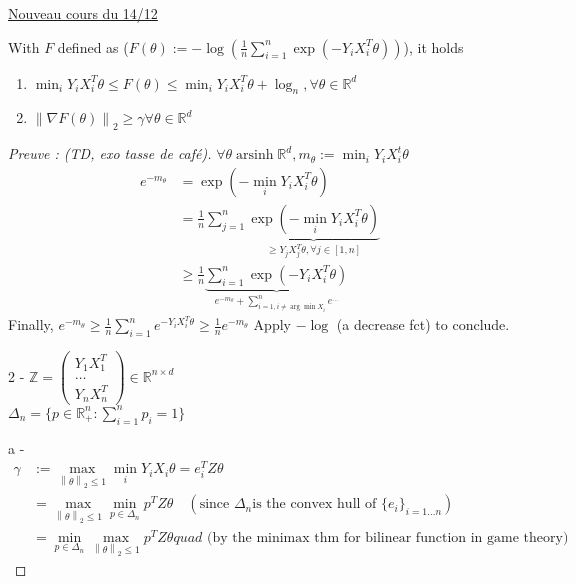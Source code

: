 \underline{Nouveau cours du 14/12} \\

\begin{lem}\label{lemma:ii}
    With $F$ defined as ($F(\theta ) := - \log (\frac{1 }{n } \sum_{i=1 }^{n } \exp (-Y_i X_i^T \theta ))$), it holds
    \begin{enumerate}
        \item $\min_i Y_i X_i^T \theta \leq F(\theta ) \leq \min _i Y_i X_i^T \theta + \log_{n}, \forall \theta \in \mathbb{R}^d  $
        \item $\left\| \nabla F(\theta ) \right\|_2 \geq \gamma \forall \theta \in \mathbb{R}^d$ 
    \end{enumerate}
\end{lem}

\begin{proof}[Preuve : (TD, exo tasse de café)]
    $ \forall \theta \operatorname{arsinh} \mathbb{R}^d, m_\theta := \min _i Y_i X_i^t \theta  $ 
    \begin{align*}
        e^{- m_\theta } 
            &= \exp (-\min _i Y_i X_i^T \theta ) \\
            &= \frac{1}{n} \sum_{j=1}^{n } \underbrace{\exp (-\min _i Y_i X_i^T \theta )}_{ \geq Y_j X_j^T \theta, \forall j \in [1, n]} \\
            &\geq  \frac{1}{n} \underbrace{\sum_{i=1}^{n } \exp (-Y_i X_i ^T \theta )}_{e^{-m_\theta } + \sum_{i=1, i \neq \arg \min X_i}^{n} e^{\dots}}
    \end{align*}
    Finally, $e^{-m_\theta } \geq  \frac{1}{n} \sum_{i=1}^{n} e^{-Y_iX_i^T \theta } \geq \frac{1}{n} e^{-m_\theta }$
    Apply $-\log$ (a decrease fct) to conclude.

    2 - $\mathbb{Z} = \begin{pmatrix}
        Y_1X_1^T \\
        \dots \\
        Y_nX_n^T
    \end{pmatrix}
    \in \mathbb{R}^{n \times d}
    $ \\
    $\Delta _n = \{p \in \mathbb{R}^n_+ : \sum_{i=1}^{n} p_i =1\}$ 

        a -
    \begin{align*}
        \gamma &:= \max _{\left\| \theta  \right\|_2 \leq 1 } \min_i Y_iX_i \theta = e_i^T Z \theta \\
        &= \max _{\left\| \theta  \right\|_2 \leq 1 } \min_{p \in \Delta_n} p ^T Z \theta \quad(\text{since } \Delta_n \text{is the convex hull of } \{e_i\}_{i=1 \dots n}) \\
        &= \min_{p \in \Delta_n}\max _{\left\| \theta  \right\|_2 \leq 1 } p ^T Z \theta quad \text{ (by the minimax thm for bilinear function in game theory)}
    \end{align*} 
    



\end{proof}
